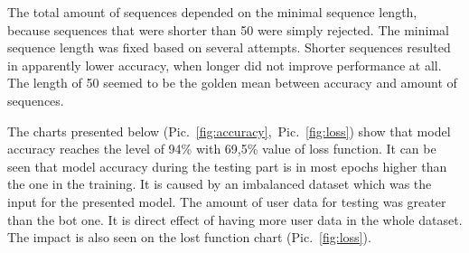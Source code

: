 The total amount of sequences depended on the minimal sequence length, because sequences that were shorter than 50 were simply rejected.
The minimal sequence length was fixed based on several attempts.
Shorter sequences resulted in apparently lower accuracy, when longer did not improve performance at all.
The length of 50 seemed to be the golden mean between accuracy and amount of sequences.

The charts presented below \mbox{(Pic.~\ref{fig:accuracy}, Pic.~\ref{fig:loss})} show that model accuracy reaches the level of 94\% with 69,5\% value of loss function.
It can be seen that model accuracy during the testing part is in most epochs higher than the one in the training.
It is caused by an imbalanced dataset which was the input for the presented model.
The amount of user data for testing was greater than the bot one.
It is direct effect of having more user data in the whole dataset.
The impact is also seen on the lost function chart \mbox{(Pic.~\ref{fig:loss})}.


